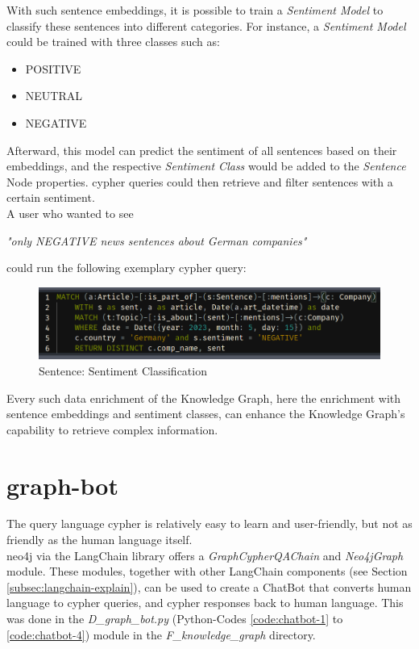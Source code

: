 With such sentence embeddings, it is possible to train a \emph{Sentiment Model} to classify these sentences into different categories.
For instance, a \emph{Sentiment Model} could be trained with three classes such as:

\begin{itemize}
    \item POSITIVE
    \item NEUTRAL
    \item NEGATIVE
\end{itemize}

Afterward, this model can predict the sentiment of all sentences based on their embeddings, and the respective \emph{Sentiment Class} would be added to the \emph{Sentence} Node properties.
\gls{cypher} queries could then retrieve and filter sentences with a certain sentiment.\\
A user who wanted to see
\begin{center}
\emph{"only NEGATIVE news sentences about German companies"}
\end{center}
could run the following exemplary \gls{cypher} query:

\begin{figure}[H]   %
    \centering
    \includegraphics[width=\textwidth]{Assets/sentiment}
    \caption{Sentence: Sentiment Classification}
    \label{fig:sentiment}
\end{figure}
Every such data enrichment of the Knowledge Graph, here the enrichment with sentence embeddings and sentiment classes, can enhance the Knowledge Graph's capability to retrieve complex information.

\section{\gls{graph-bot}}
The query language \gls{cypher} is relatively easy to learn and user-friendly, but not as friendly as the human language itself.\\
neo4j \cite{neo4j} via the LangChain \cite{LangChain} library offers a \emph{GraphCypherQAChain} and \emph{Neo4jGraph} module.
These modules, together with other LangChain components (see Section \ref{subsec:langchain-explain}), can be used to create a ChatBot that converts human language to \gls{cypher} queries, and \gls{cypher} responses back to human language.
This was done in the \emph{D\_graph\_bot.py} (Python-Codes \ref{code:chatbot-1} to \ref{code:chatbot-4}) module in the \emph{F\_knowledge\_graph} directory.

